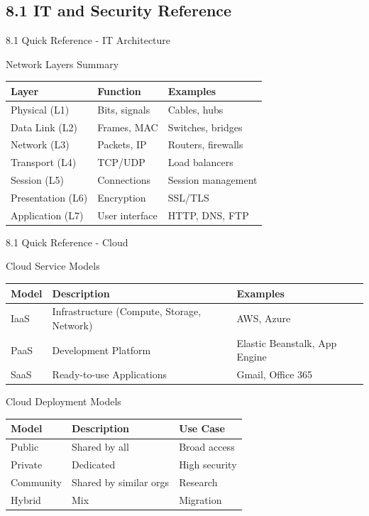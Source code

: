 \documentclass{beamer}
\begin{document}
	\subsection{8.1 IT and Security Reference}
	\begin{frame}{8.1 Quick Reference - IT Architecture}
		\begin{block}{Network Layers Summary}
			\begin{tabular}{|p{2.5cm}|p{4cm}|p{4.5cm}|}
				\hline
				\textbf{Layer} & \textbf{Function} & \textbf{Examples} \\
				\hline
				Physical (L1) & Bits, signals & Cables, hubs \\
				\hline
				Data Link (L2) & Frames, MAC & Switches, bridges \\
				\hline
				Network (L3) & Packets, IP & Routers, firewalls \\
				\hline
				Transport (L4) & TCP/UDP & Load balancers \\
				\hline
				Session (L5) & Connections & Session management \\
				\hline
				Presentation (L6) & Encryption & SSL/TLS \\
				\hline
				Application (L7) & User interface & HTTP, DNS, FTP \\
				\hline
			\end{tabular}
		\end{block}
	\end{frame}
	
	\begin{frame}{8.1 Quick Reference - Cloud}
		\begin{block}{Cloud Service Models}
			\begin{tabular}{|p{2.5cm}|p{4cm}|p{4.5cm}|}
				\hline
				\textbf{Model} & \textbf{Description} & \textbf{Examples} \\
				\hline
				IaaS & Infrastructure (Compute, Storage, Network) & AWS, Azure \\
				\hline
				PaaS & Development Platform & Elastic Beanstalk, App Engine \\
				\hline
				SaaS & Ready-to-use Applications & Gmail, Office 365 \\
				\hline
			\end{tabular}
		\end{block}
		
		\begin{block}{Cloud Deployment Models}
			\begin{tabular}{|p{2.5cm}|p{4cm}|p{4.5cm}|}
				\hline
				\textbf{Model} & \textbf{Description} & \textbf{Use Case} \\
				\hline
				Public & Shared by all & Broad access \\
				\hline
				Private & Dedicated & High security \\
				\hline
				Community & Shared by similar orgs & Research \\
				\hline
				Hybrid & Mix & Migration \\
				\hline
			\end{tabular}
		\end{block}
	\end{frame}
	
\end{document}
